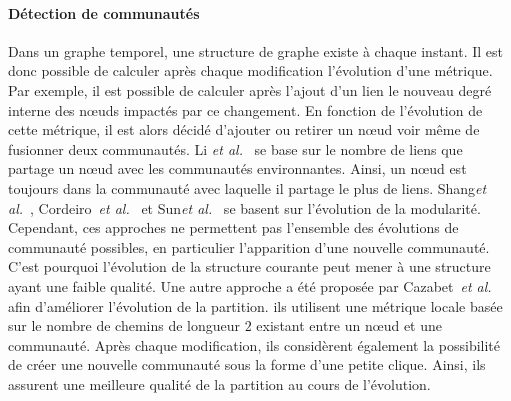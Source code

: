 \paragraph{Détection de communautés}
Dans un graphe temporel, une structure de graphe existe à chaque instant.
Il est donc possible de calculer après chaque modification l'évolution d'une métrique.
Par exemple, il est possible de calculer après l'ajout d'un lien le nouveau degré interne des n\oe uds impactés par ce changement.
En fonction de l'évolution de cette métrique, il est alors décidé d'ajouter ou retirer un n\oe ud voir même de fusionner deux communautés.
Li \emph{et al.}~\cite{Li2012a} se base sur le nombre de liens que partage un n\oe ud avec les communautés environnantes.
Ainsi, un n\oe ud est toujours dans la communauté avec laquelle il partage le plus de liens.
Shang\emph{et al.}~\cite{Shang2014a}, Cordeiro~\emph{et al.}~\cite{Cordeiro2016} et Sun\emph{et al.}~\cite{Sun2014} se basent sur l'évolution de la modularité.
Cependant, ces approches ne permettent pas l'ensemble des évolutions de communauté possibles, en particulier l'apparition d'une nouvelle communauté.
C'est pourquoi l'évolution de la structure courante peut mener à une structure ayant une faible qualité.
Une autre approche a été proposée par Cazabet~\emph{et al.}~\cite{Cazabet2010} afin d'améliorer l'évolution de la partition.
ils utilisent une métrique locale basée sur le nombre de chemins de longueur $2$ existant entre un n\oe ud et une communauté.
Après chaque modification, ils considèrent également la possibilité de créer une nouvelle communauté sous la forme d'une petite clique.
Ainsi, ils assurent une meilleure qualité de la partition au cours de l'évolution.



